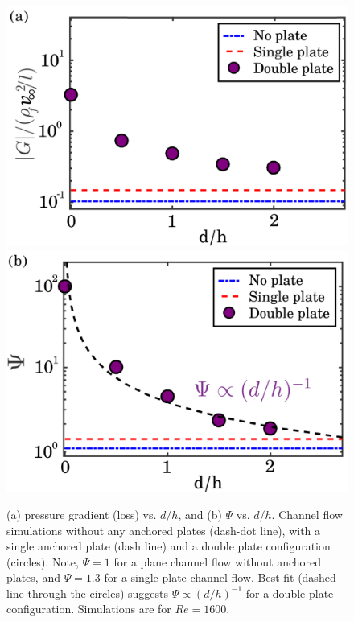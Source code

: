 \documentclass[aps,pre,twocolumn,aps,longbibliography]{revtex4-1}
\begin{document}
	
	\begin{figure}
		\begin{minipage}[c]{1\linewidth}
			\includegraphics[width=0.95\linewidth]{Fig20a.pdf} \\
			\includegraphics[width=0.95\linewidth]{Fig20b.pdf} 
		\end{minipage} 
		\caption{(a) pressure gradient (loss) vs. $d/h$, and (b) $\Psi$ vs. $d/h$. Channel flow simulations without any anchored plates (dash-dot line), with a single anchored plate (dash line) and a double plate configuration (circles). Note, $\Psi=1$ for a plane channel flow without anchored plates, and $\Psi=1.3$ for a single plate channel flow. Best fit (dashed line through the circles) suggests $\Psi\propto (d/h)^{-1}$ for a double plate configuration. Simulations are for $Re=1600$.}
		\label{fig:core_BL_vs_Re2} 
	\end{figure} 
	
\end{document}
